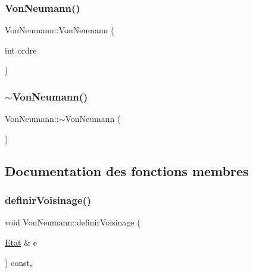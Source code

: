 \subsubsection{\texorpdfstring{Von\+Neumann()}{VonNeumann()}}
{\footnotesize\ttfamily Von\+Neumann\+::\+Von\+Neumann (\begin{DoxyParamCaption}\item[{int}]{ordre }\end{DoxyParamCaption})\hspace{0.3cm}{\ttfamily [inline]}}

\mbox{\label{class_von_neumann_ac499842c3b775df77ad7d16bea19a911}} 
\subsubsection{\texorpdfstring{$\sim$\+Von\+Neumann()}{~VonNeumann()}}
{\footnotesize\ttfamily Von\+Neumann\+::$\sim$\+Von\+Neumann (\begin{DoxyParamCaption}{ }\end{DoxyParamCaption})\hspace{0.3cm}{\ttfamily [default]}}



\subsection{Documentation des fonctions membres}
\mbox{\label{class_von_neumann_a7e85faf5f9bedb3d1fef9b9536aeba4f}} 
\subsubsection{\texorpdfstring{definir\+Voisinage()}{definirVoisinage()}}
{\footnotesize\ttfamily void Von\+Neumann\+::definir\+Voisinage (\begin{DoxyParamCaption}\item[{\mbox{\hyperlink{class_etat}{Etat}} \&}]{e }\end{DoxyParamCaption}) const\hspace{0.3cm}{\ttfamily [override]}, {\ttfamily [virtual]}}



